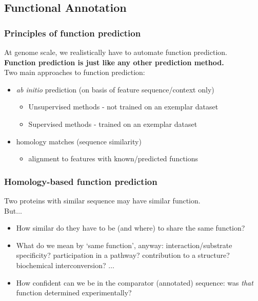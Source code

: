 
\subsection{Functional Annotation}

\begin{frame}
  \frametitle{Principles of function prediction}
  At genome scale, we realistically have to automate function prediction. \\
  \textbf{Function prediction is just like any other prediction method.} \\
  Two main approaches to function prediction:
  \begin{itemize}
    \item \textit{ab initio} prediction (on basis of feature sequence/context only)
    \begin{itemize}
      \item Unsupervised methods - not trained on an exemplar dataset
      \item Supervised methods - trained on an exemplar dataset
    \end{itemize}
    \item homology matches (sequence similarity)
    \begin{itemize}
      \item alignment to features with known/predicted functions
    \end{itemize}
  \end{itemize}
\end{frame}

\begin{frame}
  \frametitle{Homology-based function prediction}
  Two proteins with similar sequence may have similar function.\\
  But$\ldots$
  \begin{itemize}
    \item How similar do they have to be (and where) to share the same function?
    \item What do we mean by `same function', anyway: interaction/substrate specificity? participation in a pathway? contribution to a structure? biochemical interconversion? $\ldots$
    \item How confident can we be in the comparator (annotated) sequence: was \textit{that} function determined experimentally?
  \end{itemize}
\end{frame}


